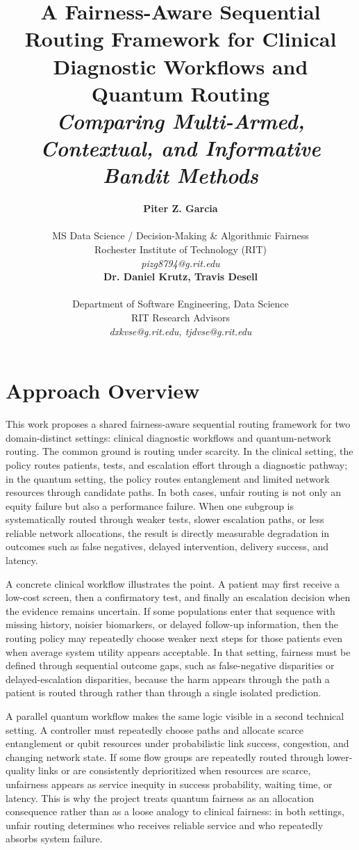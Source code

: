 \documentclass{IEEEtran}
\title{A Fairness-Aware Sequential Routing Framework for Clinical Diagnostic Workflows and Quantum Routing\\[0.3em]
{\large\textit{Comparing Multi-Armed, Contextual, and Informative Bandit Methods}}}
\author{%
\begin{minipage}{0.48\textwidth}
\begin{center}
{\bf Piter Z. Garcia}\\
\begin{small}
MS Data Science / Decision-Making \& Algorithmic Fairness\\
Rochester Institute of Technology (RIT)\\
{\it pizg8794@g.rit.edu}
\end{small}
\end{center}
\end{minipage}
\hfill
\begin{minipage}{0.48\textwidth}
\begin{center}
{\bf Dr. Daniel Krutz, Travis Desell}\\
\begin{small}
Department of Software Engineering, Data Science\\
RIT Research Advisors\\
{\it dxkvse@g.rit.edu, tjdvse@g.rit.edu}
\end{small}
\end{center}
\end{minipage}%
}
\begin{document}
\maketitle
\vspace{-0.7em}

\section{Approach Overview}
This work proposes a shared fairness-aware sequential routing framework for two domain-distinct settings: clinical diagnostic workflows and quantum-network routing. The common ground is routing under scarcity. In the clinical setting, the policy routes patients, tests, and escalation effort through a diagnostic pathway; in the quantum setting, the policy routes entanglement and limited network resources through candidate paths. In both cases, unfair routing is not only an equity failure but also a performance failure. When one subgroup is systematically routed through weaker tests, slower escalation paths, or less reliable network allocations, the result is directly measurable degradation in outcomes such as false negatives, delayed intervention, delivery success, and latency.

A concrete clinical workflow illustrates the point. A patient may first receive a low-cost screen, then a confirmatory test, and finally an escalation decision when the evidence remains uncertain. If some populations enter that sequence with missing history, noisier biomarkers, or delayed follow-up information, then the routing policy may repeatedly choose weaker next steps for those patients even when average system utility appears acceptable. In that setting, fairness must be defined through sequential outcome gaps, such as false-negative disparities or delayed-escalation disparities, because the harm appears through the path a patient is routed through rather than through a single isolated prediction.

A parallel quantum workflow makes the same logic visible in a second technical setting. A controller must repeatedly choose paths and allocate scarce entanglement or qubit resources under probabilistic link success, congestion, and changing network state. If some flow groups are repeatedly routed through lower-quality links or are consistently deprioritized when resources are scarce, unfairness appears as service inequity in success probability, waiting time, or latency. This is why the project treats quantum fairness as an allocation consequence rather than as a loose analogy to clinical fairness: in both settings, unfair routing determines who receives reliable service and who repeatedly absorbs system failure.
\end{document}
